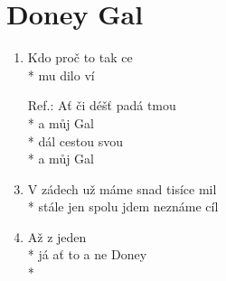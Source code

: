 \section{Doney Gal} %
\begin{enumerate}
\item Kdo  proč to  tak ce  \\*
 mu dilo ví  
\item[Ref.:] Ať  či déšť padá tmou \\*
 a můj  Gal   \\*
 dál cestou svou \\*
 a můj  Gal   
\item V zádech už máme snad tisíce mil \\*
stále jen spolu jdem neznáme cíl 
\item Až z  jeden    \\*
já ať to  a ne  Doney  \\*
\end{enumerate}
